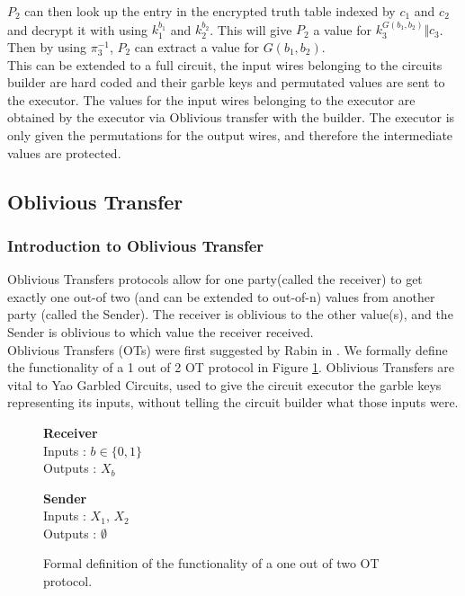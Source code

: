 \documentclass[a4paper,10pt]{article}
\begin{document}
		$P_2$ can then look up the entry in the encrypted truth table indexed by $c_1$ and $c_2$ and decrypt it with using $k_1^{b_1}$ and  $k_2^{b_2}$. This will give $P_2$ a value for $k_3^{G(b_1, b_2)} \Vert c_3$. Then by using $\pi_3^{-1}$, $P_2$ can extract a value for $G(b_1, b_2)$.\\

		This can be extended to a full circuit, the input wires belonging to the circuits builder are hard coded and their garble keys and permutated values are sent to the executor. The values for the input wires belonging to the executor are obtained by the executor via Oblivious transfer with the builder. The executor is only given the permutations for the output wires, and therefore the intermediate values are protected.


  \subsection{Oblivious Transfer} \label{OT_Intro}
    \subsubsection{Introduction to Oblivious Transfer}
      Oblivious Transfers protocols allow for one party(called the receiver) to get exactly one out-of two (and can be extended to out-of-n) values from another party (called the Sender). The receiver is oblivious to the other value(s), and the Sender is oblivious to which value the receiver received.\\

      Oblivious Transfers (OTs) were first suggested by Rabin in \cite{Rabin81}. We formally define the functionality of a 1 out of 2 OT protocol in Figure \ref{fig:OTformalDef}. Oblivious Transfers are vital to Yao Garbled Circuits, used to give the circuit executor the garble keys representing its inputs, without telling the circuit builder what those inputs were.\\

      \begin{figure}[!htb]
	\centering
	\begin{minipage}{0.45\textwidth}
	  \centering
	  \textbf{Receiver}\\
	  Inputs : $b \in \{0, 1\}$\\
	  Outputs : $X_b$\\
	\end{minipage}
	\begin{minipage}{0.45\textwidth}
	  \centering
	  \textbf{Sender}\\
	  Inputs : $X_1$, $X_2$\\
	  Outputs : $\emptyset$\\
	\end{minipage}
	\caption{ Formal definition of the functionality of a one out of two OT protocol.\label{fig:OTformalDef}}
      \end{figure}
      
\end{document}
